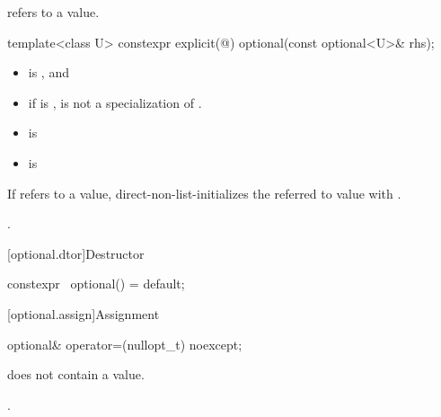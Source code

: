 \documentclass[a4paper,10pt,oneside,openany,final,article]{memoir}
\begin{document}
\begin{wording}
\begin{itemdescr}
    \pnum
    \ensures
     refers to a value.

  \end{itemdescr}

  \begin{itemdecl}
    template<class U> constexpr explicit(@\seebelow@) optional(const optional<U>& rhs);
  \end{itemdecl}

  \begin{itemdescr}
    \pnum
    \constraints
    \begin{itemize}
    \item {} is , and
    \item if  is \cv{} ,
       is not a specialization of .
    \end{itemize}

    \pnum
    \mandates
    \begin{itemize}
    \item {} is 
    \item {} is 
    \end{itemize}

    \pnum
    \effects
    If  refers to a value,
    direct-non-list-initializes the referred to value with .

    \pnum
    \ensures
    .
  \end{itemdescr}


  [optional.dtor]{Destructor}

  \begin{itemdecl}
    constexpr ~optional() = default;
  \end{itemdecl}

  [optional.assign]{Assignment}

  \begin{itemdecl}
    optional& operator=(nullopt_t) noexcept;
  \end{itemdecl}

  \begin{itemdescr}
    \pnum
    \ensures
     does not contain a value.

    \pnum
    \returns
    .
  \end{itemdescr}


\end{wording}
\end{document}
